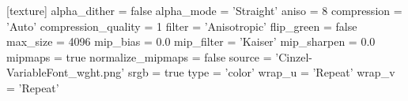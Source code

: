 [texture]
alpha_dither = false
alpha_mode = 'Straight'
aniso = 8
compression = 'Auto'
compression_quality = 1
filter = 'Anisotropic'
flip_green = false
max_size = 4096
mip_bias = 0.0
mip_filter = 'Kaiser'
mip_sharpen = 0.0
mipmaps = true
normalize_mipmaps = false
source = 'Cinzel-VariableFont_wght.png'
srgb = true
type = 'color'
wrap_u = 'Repeat'
wrap_v = 'Repeat'
